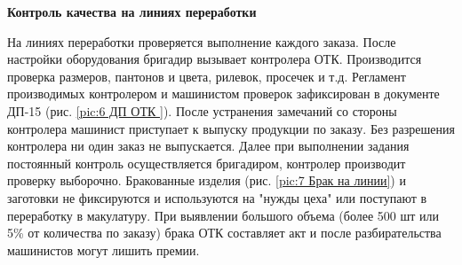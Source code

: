 \textbf{Контроль качества на линиях переработки}

На линиях переработки проверяется выполнение каждого заказа. После настройки оборудования бригадир вызывает контролера ОТК. Производится проверка размеров, пантонов и цвета, рилевок, просечек и т.д. Регламент производимых контролером и машинистом проверок зафиксирован в документе ДП-15 (рис. \ref{pic:6 ДП ОТК }). После устранения замечаний со стороны контролера машинист приступает к выпуску продукции по заказу. Без разрешения контролера ни один заказ не выпускается. Далее при выполнении задания постоянный контроль осуществляется бригадиром, контролер производит проверку выборочно. Бракованные изделия (рис. \ref{pic:7 Брак на линии}) и заготовки не фиксируются и используются на "нужды цеха"  или поступают в переработку в макулатуру. При выявлении большого объема (более 500 шт или 5\% от количества по заказу) брака ОТК составляет акт  и после разбирательства машинистов могут лишить премии.   









